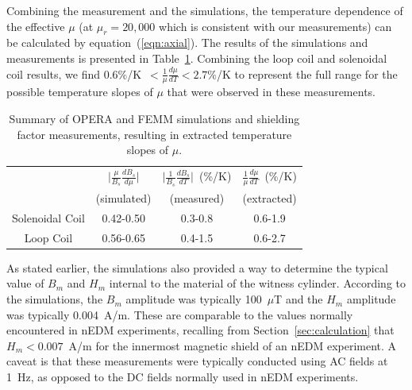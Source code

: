 Combining the measurement and the simulations, the temperature
dependence of the effective $\mu$ (at $\mu_r=20,000$ which is
consistent with our measurements) can be calculated by
equation~(\ref{eqn:axial}).  The results of the simulations and
measurements is presented in Table~\ref{tab:axialsummary}. Combining
the loop coil and solenoidal coil results, we find
0.6\%/K~$<\frac{1}{\mu}\frac{d\mu}{dT}<2.7\%$/K to represent the full
range for the possible temperature slopes of $\mu$ that were observed
in these measurements.

\begin{table}
\begin{center}
\begin{tabular}{|c|c|c|c|}
\hline 
  & $\vert \frac{\mu}{B_s}\frac{dB_s}{d\mu}\vert$ & $\vert \frac{1}{B_s} \frac{dB_s}{dT}\vert$~(\%/K) & $\frac{1}{\mu}\frac{d\mu}{dT}$~(\%/K) \\ 
 & (simulated) & (measured) & (extracted) \\
\hline 
Solenoidal Coil & 0.42-0.50 & 0.3-0.8 & 0.6-1.9 \\ 
\hline 
Loop Coil & 0.56-0.65 & 0.4-1.5 & 0.6-2.7 \\ 
\hline 
\end{tabular} 
\caption[Summary of finite element simulations and shielding factor
measurements]{Summary of OPERA and FEMM simulations and shielding
  factor measurements, resulting in extracted temperature slopes of
  $\mu$.}
\label{tab:axialsummary}
\end{center}

\end{table}


As stated earlier, the simulations also provided a way to determine
the typical value of $B_m$ and $H_m$ internal to the material of the
witness cylinder.  According to the simulations, the $B_m$ amplitude
was typically 100~$\mu$T and the $H_m$ amplitude was typically
0.004~A/m.  These are comparable to the values normally encountered in
nEDM experiments, recalling from Section~\ref{sec:calculation} that
$H_m<0.007$~A/m for the innermost magnetic shield of an nEDM
experiment.  A caveat is that these measurements were typically
conducted using AC fields at 1~Hz, as opposed to the DC fields
normally used in nEDM experiments.
